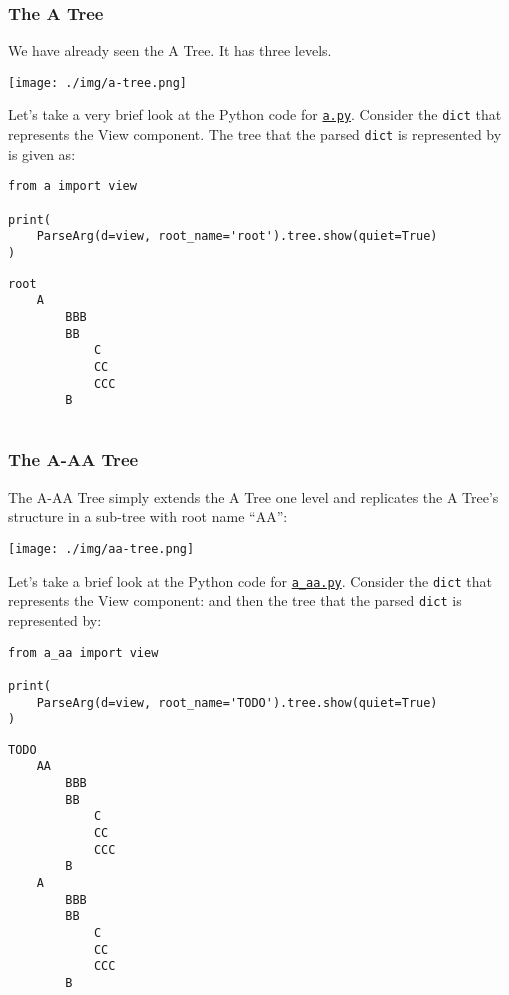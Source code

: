 \documentclass[10pt]{amsart}
\numberwithin{equation}{section}
\begin{document}
\subsubsection{The A Tree}
\label{sec:org0072930}
We have already seen the A Tree. It has three levels. 
\begin{center}
\texttt{[image: ./img/a-tree.png]}
\end{center}

Let's take a very brief look at the Python code for \href{https://github.com/tharte/parsearg/blob/master/parsearg/examples/a.py}{\texttt{a.py}}.
Consider the \texttt{dict} that represents the View component.
The tree that the parsed \texttt{dict} is represented by is given as:
\begin{verbatim}
from a import view

print(
    ParseArg(d=view, root_name='root').tree.show(quiet=True)
)
\end{verbatim}

\begin{verbatim}
root
    A
        BBB
        BB
            C
            CC
            CCC
        B


\end{verbatim}

\subsubsection{The A-AA Tree}
\label{sec:org5178e03}
The A-AA Tree simply extends the A Tree one level and replicates the A Tree's 
structure in a sub-tree with root name ``AA'':
\begin{center}
\texttt{[image: ./img/aa-tree.png]}
\end{center}

Let's take a brief look at the Python code for \href{https://github.com/tharte/parsearg/blob/master/parsearg/examples/a\_aa.py}{\texttt{a\_aa.py}}.
Consider the \texttt{dict} that represents the View component:
and then the tree that the parsed \texttt{dict} is represented by:
\begin{verbatim}
from a_aa import view

print(
    ParseArg(d=view, root_name='TODO').tree.show(quiet=True)
)
\end{verbatim}

\begin{verbatim}
TODO
    AA
        BBB
        BB
            C
            CC
            CCC
        B
    A
        BBB
        BB
            C
            CC
            CCC
        B


\end{verbatim}
\end{document}
